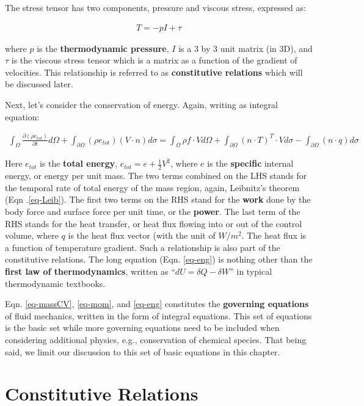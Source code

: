 \documentclass[12pt, letterpaper]{report}
\begin{document}
The stress tensor has two components, pressure and viscous stress, expressed as:

\begin{align*}
   T = -p I + \tau
\end{align*}

where $p$ is the {\bf thermodynamic pressure}, $I$ is a 3 by 3 unit matrix (in 3D), and $\tau$ is the
viscous stress tensor which is a matrix as a function of the gradient of velocities. This
relationship is referred to as {\bf constitutive relations} which will be discussed later.
\paraspace

Next, let's consider the conservation of energy. Again, writing as integral equation:

\begin{align}\label{eq-eng}
   \int_\Omega\frac{\partial(\rho e_{tot})}{\partial t} d\Omega + \int_{\partial\Omega}(\rho
   e_{tot}) (V \cdot n) d\sigma = \int_\Omega \rho f \cdot V d\Omega + \int_{\partial\Omega} (n\cdot
   T)^T \cdot V d\sigma - \int_{\partial\Omega}(n \cdot q) d\sigma
\end{align}

Here $e_{tot}$ is the {\bf total energy}, $e_{tot} = e + \tfrac{1}{2}V^2$, where $e$ is the
{\bf specific} internal energy, or energy per unit mass. The two terms combined on the LHS stands
for the temporal rate of total energy of the mass region, again, Leibnitz's theorem (Eqn
.\ref{eq-Leib}). The first two terms on the RHS stand for the {\bf work} done by the body force and
surface force per unit time, or the {\bf power}. The last term of the RHS stands for the heat
transfer, or heat flux flowing into or out of the control volume, where $q$ is the heat flux vector
(with the unit of $W/m^2$. The heat flux is a function of temperature gradient. Such a relationship
is also part of the constitutive relations. The long equation (Eqn. \ref{eq-eng}) is nothing other
than the {\bf first law of thermodynamics}, written as ``$dU = \delta Q - \delta W$'' in typical
thermodynamic textbooks.
\paraspace

Eqn. \ref{eq-massCV}, \ref{eq-mom}, and \ref{eq-eng} constitutes the {\bf governing equations} of
fluid mechanics, written in the form of integral equations. This set of equations is the basic set
while more governing equations need to be included when considering additional physics, e.g.,
conservation of chemical species. That being said, we limit our discussion to this set of basic
equations in this chapter.
\paraspace

\section{Constitutive Relations}
\end{document}
